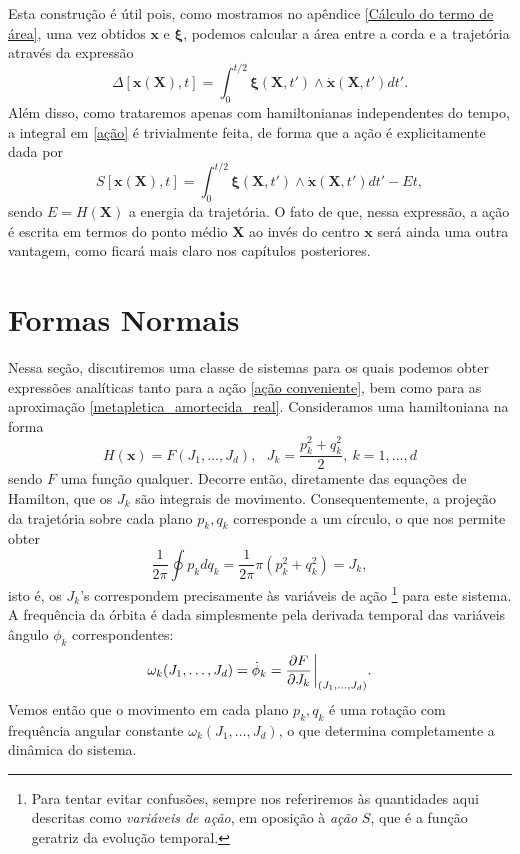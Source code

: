 \documentclass[
	12pt,
	oneside,			%
	a4paper,			%
	english,			%
	brazil				%
	]{abntex2}
\theoremstyle{definition}
\begin{document}
Esta construção é útil pois, como mostramos no apêndice \ref{Cálculo do termo de área}, uma vez obtidos $\mathbf{x}$ e $\boldsymbol{\xi}$, podemos calcular a área entre a corda e a trajetória através da expressão
\begin{equation}
    \Delta\left[ \mathbf{x}\left( \mathbf{X}\right),t \right] = \int_0^{t/2} \boldsymbol{\xi}\left(\mathbf{X}, t' \right) \wedge \dot{\mathbf{x}}\left(\mathbf{X}, t' \right) dt'.
\end{equation}
Além disso, como trataremos apenas com hamiltonianas independentes do tempo, a integral em \eqref{ação} é trivialmente feita, de forma que a ação é explicitamente dada por
\begin{equation}
\label{ação conveniente}
    S\left[ \mathbf{x}\left( \mathbf{X} \right),t \right] = \int_0^{t/2} \boldsymbol{\xi}\left(\mathbf{X}, t' \right) \wedge \dot{\mathbf{x}}\left(\mathbf{X}, t' \right) dt' - E t,
\end{equation}
sendo $E = H\left( \mathbf{X} \right)$ a energia da trajetória. O fato de que, nessa expressão, a ação é escrita em termos do ponto médio $\mathbf{X}$ ao invés do centro $\mathbf{x}$ será ainda uma outra vantagem, como ficará mais claro nos capítulos posteriores.

\section{Formas Normais}
\label{Formas Normais}

Nessa seção, discutiremos uma classe de sistemas para os quais podemos obter expressões analíticas tanto para a ação \eqref{ação conveniente}, bem como para as aproximação \eqref{metapletica_amortecida_real}. Consideramos uma hamiltoniana na forma
\begin{equation}
\label{forma normal}
     H(\mathbf{x}) = F \left( J_1,\ldots,J_d \right), \ \ \ J_k = \frac{p_k^2 + q_k^2}{2}, \ k = 1,\ldots,d
\end{equation}
sendo $F$ uma função qualquer. Decorre então, diretamente das equações de Hamilton, que os $J_k$ são integrais de movimento. Consequentemente, a projeção da trajetória sobre cada plano $p_k,q_k$ corresponde a um círculo, o que nos permite obter
\begin{equation}
    \frac{1}{2\pi} \oint p_k dq_k = \frac{1}{2\pi} \pi \left( p_k^2 + q_k^2 \right) = J_k,
\end{equation}
isto é, os $J_k$'s correspondem precisamente às variáveis de ação \footnote{Para tentar evitar confusões, sempre nos referiremos às quantidades aqui descritas como \textit{variáveis de ação}, em oposição à \textit{ação} $S$, que é a função geratriz da evolução temporal.} para este sistema. A frequência da órbita é dada simplesmente pela derivada temporal das variáveis ângulo $\phi_k$ correspondentes:
\begin{equation}
    \omega_k(J_1,\ldots,J_d) = \dot{\phi}_k = \frac{\partial F}{\partial J_k} \eval_{(J_1,\ldots,J_d)}.
\end{equation}
Vemos então que o movimento em cada plano $p_k,q_k$ é uma rotação com frequência angular constante $\omega_k(J_1,\ldots,J_d)$, o que determina completamente a dinâmica do sistema.
\end{document}
